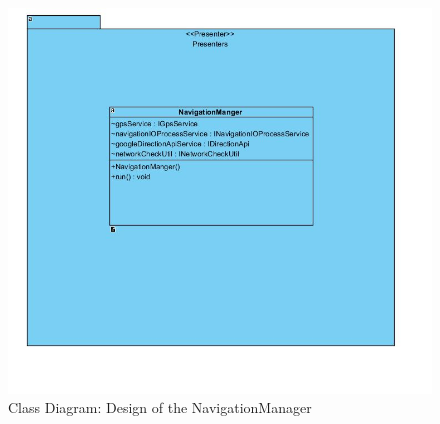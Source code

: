     \begin{figure}[htbp!]
        \centering \includegraphics[scale=0.6]{grafiken/liskov.jpg}
        \caption{Class Diagram: Design of the NavigationManager}
        \label{fig:navigationManagerClassDiagram}
    \end{figure}